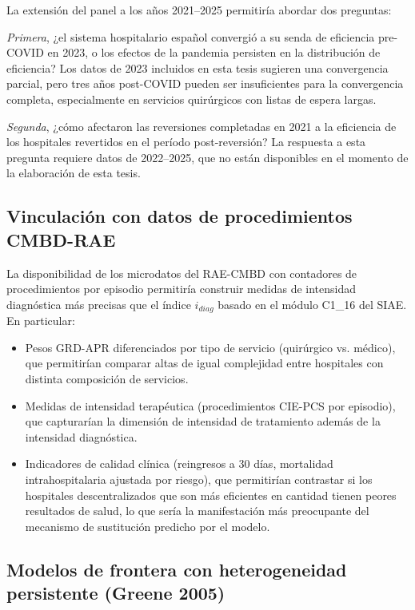 \documentclass[12pt, a4paper, twoside, openright]{book}
\theoremstyle{plain}
\theoremstyle{definition}
\theoremstyle{remark}
\begin{document}
La extensión del panel a los años 2021--2025 permitiría abordar dos preguntas:

\textit{Primera}, ¿el sistema hospitalario español convergió a su senda de eficiencia pre-COVID en 2023, o los efectos de la pandemia persisten en la distribución de eficiencia? Los datos de 2023 incluidos en esta tesis sugieren una convergencia parcial, pero tres años post-COVID pueden ser insuficientes para la convergencia completa, especialmente en servicios quirúrgicos con listas de espera largas.

\textit{Segunda}, ¿cómo afectaron las reversiones completadas en 2021 a la eficiencia de los hospitales revertidos en el período post-reversión? La respuesta a esta pregunta requiere datos de 2022--2025, que no están disponibles en el momento de la elaboración de esta tesis.

\subsection{Vinculación con datos de procedimientos CMBD-RAE}

La disponibilidad de los microdatos del RAE-CMBD con contadores de procedimientos por episodio permitiría construir medidas de intensidad diagnóstica más precisas que el índice $i_{diag}$ basado en el módulo C1\_16 del SIAE. En particular:

\begin{itemize}
  \item Pesos GRD-APR diferenciados por tipo de servicio (quirúrgico vs. médico), que permitirían comparar altas de igual complejidad entre hospitales con distinta composición de servicios.
  \item Medidas de intensidad terapéutica (procedimientos CIE-PCS por episodio), que capturarían la dimensión de intensidad de tratamiento además de la intensidad diagnóstica.
  \item Indicadores de calidad clínica (reingresos a 30 días, mortalidad intrahospitalaria ajustada por riesgo), que permitirían contrastar si los hospitales descentralizados que son más eficientes en cantidad tienen peores resultados de salud, lo que sería la manifestación más preocupante del mecanismo de sustitución predicho por el modelo.
\end{itemize}

\subsection{Modelos de frontera con heterogeneidad persistente (Greene 2005)}
\end{document}
